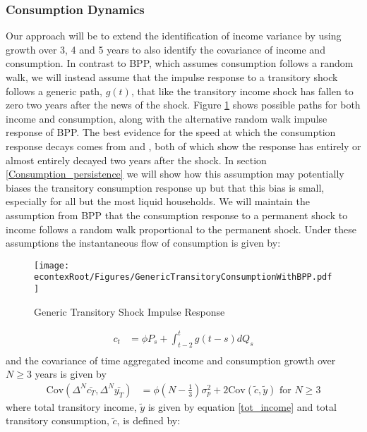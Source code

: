 \documentclass[titlepage]{\econtex}\newcommand{\texname}{ConsumptionHeterogeneity}
\begin{document}
\subsubsection{Consumption Dynamics}
Our approach will be to extend the identification of income variance by using growth over 3, 4 and 5 years to also identify the covariance of income and consumption. In contrast to BPP, which assumes consumption follows a random walk, we will instead assume that the impulse response to a transitory shock follows a generic path, $g(t)$, that like the transitory income shock has fallen to zero two years after the news of the shock. Figure \ref{fig:GenericTransitoryBPP} shows possible paths for both income and consumption, along with the alternative random walk impulse response of BPP. The best evidence for the speed at which the consumption response decays comes from \cite{gelman_what_2016} and \cite{fagereng_mpc_2016}, both of which show the response has entirely or almost entirely decayed two years after the shock. In section \ref{Consumption_persistence} we will show how this assumption may potentially biases the transitory consumption response up but that this bias is small, especially for all but the most liquid households. We will maintain the assumption from BPP that the consumption response to a permanent shock to income follows a random walk proportional to the permanent shock. Under these assumptions the instantaneous flow of consumption is given by:	\begin{figure} 
	\begin{centering}
		\texttt{[image: \\econtexRoot/Figures/GenericTransitoryConsumptionWithBPP.pdf]} 
		\caption{Generic Transitory Shock Impulse Response}
		\label{fig:GenericTransitoryBPP}
	\end{centering}
\end{figure}
\begin{align*}
c_t  &= \phi P_s  + \int_{t-2}^{t} g(t-s)dQ_s  \\
\end{align*}
and the covariance of time aggregated income and consumption growth over $N \geq 3$ years is given by
\begin{align}
\mathrm{Cov}(\Delta^N \bar{c_T},\Delta^N \bar{y_T} ) &= \phi (N-\frac{1}{3}) \sigma^2_p + 2 \mathrm{Cov}(\tilde{c},\tilde{y}) \text{  for  } N\geq 3 \label{covariance}
\end{align}
where total transitory income, $\tilde{y}$ is given by equation \ref{tot_income} and total transitory consumption, $\tilde{c}$, is defined by:
\end{document}
